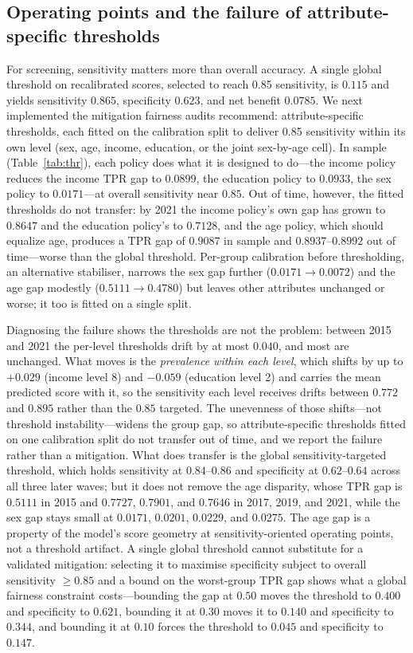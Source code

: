 \documentclass[conference]{IEEEtran}
\begin{document}
\subsection{Operating points and the failure of attribute-specific thresholds}
For screening, sensitivity matters more than overall accuracy. A single global threshold on recalibrated scores, selected to reach 0.85 sensitivity, is $0.115$ and yields sensitivity $0.865$, specificity $0.623$, and net benefit $0.0785$. We next implemented the mitigation fairness audits recommend: attribute-specific thresholds, each fitted on the calibration split to deliver 0.85 sensitivity within its own level (sex, age, income, education, or the joint sex-by-age cell). In sample (Table~\ref{tab:thr}), each policy does what it is designed to do---the income policy reduces the income TPR gap to $0.0899$, the education policy to $0.0933$, the sex policy to $0.0171$---at overall sensitivity near $0.85$. Out of time, however, the fitted thresholds do not transfer: by 2021 the income policy's own gap has grown to $0.8647$ and the education policy's to $0.7128$, and the age policy, which should equalize age, produces a TPR gap of $0.9087$ in sample and $0.8937$--$0.8992$ out of time---worse than the global threshold. Per-group calibration before thresholding, an alternative stabiliser, narrows the sex gap further ($0.0171 \rightarrow 0.0072$) and the age gap modestly ($0.5111 \rightarrow 0.4780$) but leaves other attributes unchanged or worse; it too is fitted on a single split.

Diagnosing the failure shows the thresholds are not the problem: between 2015 and 2021 the per-level thresholds drift by at most $0.040$, and most are unchanged. What moves is the \emph{prevalence within each level}, which shifts by up to $+0.029$ (income level 8) and $-0.059$ (education level 2) and carries the mean predicted score with it, so the sensitivity each level receives drifts between $0.772$ and $0.895$ rather than the $0.85$ targeted. The unevenness of those shifts---not threshold instability---widens the group gap, so attribute-specific thresholds fitted on one calibration split do not transfer out of time, and we report the failure rather than a mitigation. What does transfer is the global sensitivity-targeted threshold, which holds sensitivity at $0.84$--$0.86$ and specificity at $0.62$--$0.64$ across all three later waves; but it does not remove the age disparity, whose TPR gap is $0.5111$ in 2015 and $0.7727$, $0.7901$, and $0.7646$ in 2017, 2019, and 2021, while the sex gap stays small at $0.0171$, $0.0201$, $0.0229$, and $0.0275$. The age gap is a property of the model's score geometry at sensitivity-oriented operating points, not a threshold artifact. A single global threshold cannot substitute for a validated mitigation: selecting it to maximise specificity subject to overall sensitivity $\ge 0.85$ and a bound on the worst-group TPR gap shows what a global fairness constraint costs---bounding the gap at $0.50$ moves the threshold to $0.400$ and specificity to $0.621$, bounding it at $0.30$ moves it to $0.140$ and specificity to $0.344$, and bounding it at $0.10$ forces the threshold to $0.045$ and specificity to $0.147$.
\end{document}
